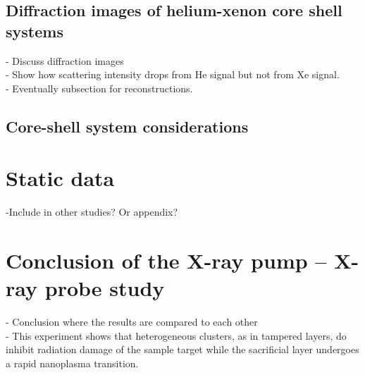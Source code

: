 \subsection{Diffraction images of helium-xenon core shell systems}
- Discuss diffraction images\\
- Show how scattering intensity drops from He signal but not from Xe signal.\\
- Eventually subsection for reconstructions.
\subsection{Core-shell system considerations}
%
%
%
\section{Static data}\label{sec:static}
-Include in other studies? Or appendix?
%
%
%
\section{Conclusion of the X-ray pump -- X-ray probe study}
- Conclusion where the results are compared to each other\\
- This experiment shows that heterogeneous clusters, as in tampered layers, do inhibit radiation damage of the sample target while the sacrificial layer undergoes a rapid nanoplasma transition.